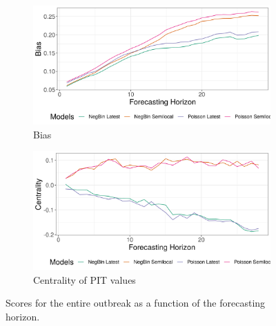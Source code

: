 \begin{figure}[H]
\begin{subfigure}{0.5\textwidth}
  \centering
  \includegraphics[width=\linewidth]{../output/Kalunguta_bias.png}  
  \caption{Bias}
  \label{fig:sub-third}
\end{subfigure}
\begin{subfigure}{0.5\textwidth}
  \centering
  \includegraphics[width=\linewidth]{../output/Kalunguta_centrality.png}  
  \caption{Centrality of PIT values}
  \label{fig:nat_scores_4}
\end{subfigure}
  \caption{Scores for the entire outbreak as a function of the forecasting horizon.}

  \label{fig:nat_scores}
\end{figure}
